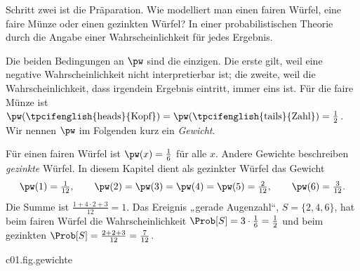 Schritt zwei ist die Präparation. Wie modelliert man einen fairen Würfel, eine faire Münze
oder einen gezinkten Würfel? In einer probabilistischen Theorie durch die Angabe einer
Wahrscheinlichkeit für jedes Ergebnis.


Die beiden Bedingungen an $\pw$ sind die einzigen. Die erste gilt, weil eine negative
Wahrscheinlichkeit nicht interpretierbar ist; die zweite, weil die Wahrscheinlichkeit, dass
irgendein Ergebnis eintritt, immer eins ist. Für die faire Münze ist
$\pw(\text{\tpcifenglish{heads}{Kopf}}) = \pw(\text{\tpcifenglish{tails}{Zahl}}) = \tfrac12$.
Wir nennen $\pw$ im Folgenden kurz ein \emph{Gewicht}.

\begin{example}\label{c01.ex.gezinkt}
  Für einen fairen Würfel ist $\pw(x) = \tfrac16$ für alle $x$. Andere Gewichte beschreiben
  \emph{gezinkte} Würfel. In diesem Kapitel dient als gezinkter Würfel das Gewicht
  \begin{equation}\label{c01.eq.gezinkt}
    \pw(1) = \tfrac{1}{12}, \qquad
    \pw(2) = \pw(3) = \pw(4) = \pw(5) = \tfrac{2}{12}, \qquad
    \pw(6) = \tfrac{3}{12} .
  \end{equation}
  Die Summe ist $\tfrac{1 + 4\cdot 2 + 3}{12} = 1$. Das Ereignis „gerade Augenzahl“,
  $S = \{2,4,6\}$, hat beim fairen Würfel die Wahrscheinlichkeit
  $\Prob[S] = 3\cdot\tfrac16 = \tfrac12$ und beim gezinkten
  $\Prob[S] = \tfrac{2 + 2 + 3}{12} = \tfrac{7}{12}$.
\end{example}

\begin{tpcfigure}{c01.fig.gewichte}
  \caption{Drei Gewichte auf der Ergebnismenge $\{1, \dots, 6\}$ eines Würfels. Die Höhe
    eines Balkens ist $\pw(x)$; in jedem Bild ist die Summe aller Höhen $1$. (a) Fairer
    Würfel. (b) Der gezinkte Würfel aus Gleichung~\eqref{c01.eq.gezinkt}. (c) Ein
    Punktgewicht: Das ganze Gewicht liegt auf dem Ergebnis $3$. Solche Gewichte beschreiben
    deterministische Präparationen (Proposition~\ref{c01.prop.punktgewicht}).}
\end{tpcfigure}

